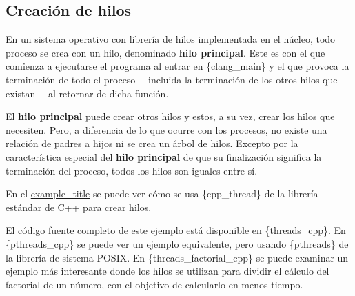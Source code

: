 \subsection{Creación de hilos}\label{_creaciuxf3n_de_hilos}

En un sistema operativo con librería de hilos implementada en el núcleo,
todo proceso se crea con un hilo, denominado \textbf{hilo principal}{}.
Este es con el que comienza a ejecutarse el programa al entrar en
\{clang\_main\} y el que provoca la terminación de todo el proceso
---incluida la terminación de los otros hilos que existan--- al retornar
de dicha función.

El \textbf{hilo principal} puede crear otros hilos y estos, a su vez,
crear los hilos que necesiten. Pero, a diferencia de lo que ocurre con
los procesos, no existe una relación de padres a hijos ni se crea un
árbol de hilos. Excepto por la característica especial del \textbf{hilo
principal} de que su finalización significa la terminación del proceso,
todos los hilos son iguales entre sí.

En el \hyperref[ejemplo-thread]{example\_title} se puede ver cómo se usa
\{cpp\_thread\} de la librería estándar de C++ para crear hilos.

El código fuente completo de este ejemplo está disponible en
\{threads\_cpp\}. En \{pthreads\_cpp\} se puede ver un ejemplo
equivalente, pero usando \{pthreads\} de la librería de sistema POSIX.
En \{threads\_factorial\_cpp\} se puede examinar un ejemplo más
interesante donde los hilos se utilizan para dividir el cálculo del
factorial de un número, con el objetivo de calcularlo en menos tiempo.


